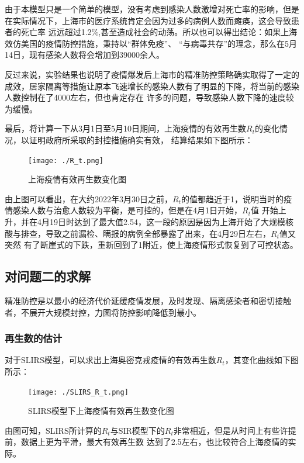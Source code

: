 \documentclass[bwprint]{gmcmthesis}
\numberwithin{figure}{section}
\begin{document}
\par 由于本模型只是一个简单的模型，没有考虑到感染人数激增对死亡率的影响，但是在实际情况下，上海市的医疗系统肯定会因为过多的病例人数而瘫痪，这会导致患者的死亡率
远远超过1.2$\%$,甚至造成社会的动荡。所以也可以得出结论：如果上海效仿美国的疫情防控措施，秉持以“群体免疫”、
“与病毒共存”的理念，那么在5月14日，现有感染人数将会增加到39000余人。
\par 反过来说，实验结果也说明了疫情爆发后上海市的精准防控策略确实取得了一定的成效，居家隔离等措施让原本飞速增长的感染人数有了明显的下降，将当前的感染人数控制在了4000左右，但也肯定存在
许多的问题，导致感染人数下降的速度较为缓慢。

\par 最后，将计算一下从3月1日至5月10日期间，上海疫情的有效再生数$R_t$的变化情况，以证明政府所采取的封控措施确实有效，
结算结果如下图所示：

\begin{figure}[!h]
    \centering
    \texttt{[image: ./R\_t.png]}
    \caption{上海疫情有效再生数变化图}
    \label{fig1}
\end{figure}

\par 由上图可以看出，在大约2022年3月30日之前，$R_t$的值都趋近于1，说明当时的疫情感染人数与治愈人数较为平衡，是可控的，但是在4月1日开始，$R_t$值
开始上升，并在4月19日时达到了最大值2.54，这一段的原因是因为上海开始了大规模核酸与排查，导致之前漏检、瞒报的病例全部暴露了出来，在4月29日左右，$R_t$值又突然
有了断崖式的下跌，重新回到了1附近，使上海疫情形式恢复到了可控状态。


\subsection{对问题二的求解}
精准防控是以最小的经济代价延缓疫情发展，及时发现、隔离感染者和密切接触者，不展开大规模封控，力图将防控影响降低到最小。
\subsubsection{再生数的估计}
\par 对于SLIRS模型，可以求出上海奥密克戎疫情的有效再生数$R_t$，其变化曲线如下图所示：
\begin{figure}[!h]
  \centering
  \texttt{[image: ./SLIRS\_R\_t.png]}
  \caption{SLIRS模型下上海疫情有效再生数变化图}
  \label{fig1}
\end{figure}
\par 由图可知，SLIRS所计算的$R_t$与SIR模型下的$R_t$非常相近，但是从时间上有些许提前，数据上更为平滑，最大有效再生数
达到了2.5左右，也比较符合上海疫情的实际。
\end{document}
